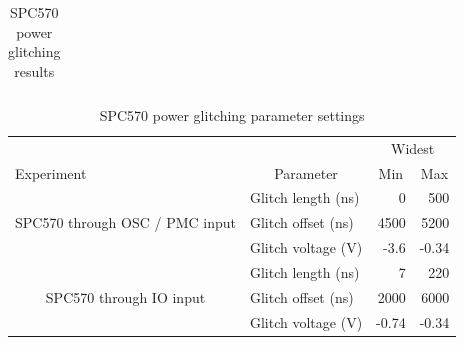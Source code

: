 \documentclass[10pt]{article}
\newcommand{\ST}{SPC570\xspace}
\begin{document}
\begin{appendices}
\begin{table}[H]
\begin{tabular}{ll rr}
      \bottomrule
      \end{tabular}
      \caption{\ST power glitching results}
      \label{tab:st-power-results}
    \end{table}

    \begin{table}[H]
      \centering
      \begin{tabular}{ll rr }
      \toprule

        &  & \multicolumn{2}{c}{Widest }     \\
             \cmidrule(lr){3-4}
        Experiment & \multicolumn{1}{c}{Parameter}  & 
        \multicolumn{1}{c}{Min}        & \multicolumn{1}{c}{Max}          \\

      \midrule

      \multicolumn{1}{c}{\multirow{3}{*}{ \parbox{2cm}{\ST through OSC / PMC input}}}
        & Glitch length (ns)   
        & 0         & 500       
        \\
        \cmidrule(l){2-4}
        & Glitch offset (ns)   
        & 4500      & 5200    
        \\ 
        \cmidrule(l){2-4}
        & Glitch voltage (V) 
        & -3.6      & -0.34    
        \\

      \midrule

      \multicolumn{1}{c}{\multirow{3}{*}{ \parbox{2cm}{\ST through IO input}}}
        & Glitch length (ns)   
        & 7         & 220       
        \\
        \cmidrule(l){2-4}
        & Glitch offset (ns)   
        & 2000      & 6000    
        \\ 
        \cmidrule(l){2-4}
        & Glitch voltage (V) 
        & -0.74      & -0.34    
        \\

      

      \bottomrule
      \end{tabular}
      \caption{\ST power glitching parameter settings}
      \label{tab:st-power-params}
    \end{table}


  \restoregeometry
\end{appendices}
\end{document}
